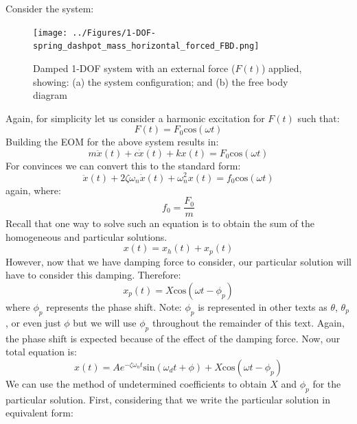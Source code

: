 \documentclass[12pt,letter]{article}
\numberwithin{ex}{section} %
\numberwithin{re}{section} %
\begin{document}
			Consider the system:
			\begin{figure}[H]
				\centering
				\texttt{[image: ../Figures/1-DOF-spring\_dashpot\_mass\_horizontal\_forced\_FBD.png]}
				\caption{Damped 1-DOF system with an external force ($F(t)$) applied, showing: (a) the system configuration; and (b) the free body diagram}
			\end{figure}	
			\noindent Again, for simplicity let us consider a harmonic excitation for $F(t)$ such that:
			\begin{equation}
				F(t) = F_0\text{cos}(\omega t)
			\end{equation}							
			Building the EOM for the above system results in:
			\begin{equation}
				m \ddot{x}(t)+c\dot{x}(t)+kx(t) = F_0\text{cos}(\omega t)
			\end{equation}			
			For convinces we can convert this to the standard form:					
			\begin{equation}
				\ddot{x}(t)+2 \zeta \omega_n \dot{x}(t) +\omega_n^2x(t) = f_0\text{cos}(\omega t)
			\end{equation}					
			again, where:
			\begin{equation}
				f_0 = \frac{F_0}{m}
			\end{equation}	
			Recall that one way to solve such an equation is to obtain the sum of the homogeneous and particular solutions. 
			\begin{equation}
				x(t) = x_h(t) + x_p(t)
			\end{equation}	
			However, now that we have damping force to consider, our particular solution will have to consider this damping. Therefore:
			\begin{equation}
				\label{eq:x_p(t)}
				x_p(t) = X \text{cos}(\omega t - \phi_p)
			\end{equation}
			where $\phi_p$ represents the phase shift. Note: $\phi_p$ is represented in other texts as $\theta$, $\theta_p$, or even just $\phi$ but we will use $\phi_p$ throughout the remainder of this text. Again, the phase shift is expected because of the effect of the damping force. Now, our total equation is:
			\begin{equation}
				x(t) = Ae^{-\zeta \omega_n t}\text{sin}(\omega_d t + \phi) +  X \text{cos}(\omega t - \phi_p)
			\end{equation}			
			We can use the method of undetermined coefficients to obtain $X$ and $\phi_p$ for the particular solution. First, considering that we write the particular solution in equivalent form:
\end{document}
